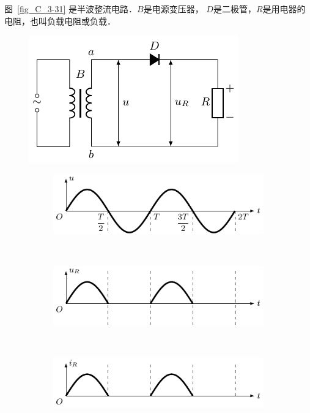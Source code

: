 图~\ref{fig_C_3-31} 是半波整流电路．$B$是电源变压器，
$D$是二极管，$R$是用电器的电阻，也叫负载电阻或负载．
\begin{figure}[htbp]
    \centering
    \begin{minipage}[b]{0.43\linewidth}
    	\centering
    	 \includegraphics{fig/C/3-31.pdf}
    	 \begin{subfigure}{0.001\linewidth}%
    	 \end{subfigure}
    	\caption{}\label{fig_C_3-31}
    \end{minipage}
     \begin{minipage}[b]{0.54\linewidth}
    	\centering
    	\begin{subfigure}{0.99\linewidth}
    		\centering
    		\includegraphics{fig/C/3-32a.pdf}
    		\caption{}\label{fig_C_3-32a}
    	\end{subfigure}
    	\\
    	\begin{subfigure}{0.99\linewidth}
    		\centering
    		\includegraphics{fig/C/3-32b.pdf}
    		\caption{}\label{fig_C_3-32b}
    	\end{subfigure}
    	\\
    	\begin{subfigure}{0.99\linewidth}
    		\centering
    		\includegraphics{fig/C/3-32c.pdf}
    		\caption{}\label{fig_C_3-32c}
    	\end{subfigure}
    	\caption{}\label{fig_C_3-32}
    \end{minipage}
\end{figure}

